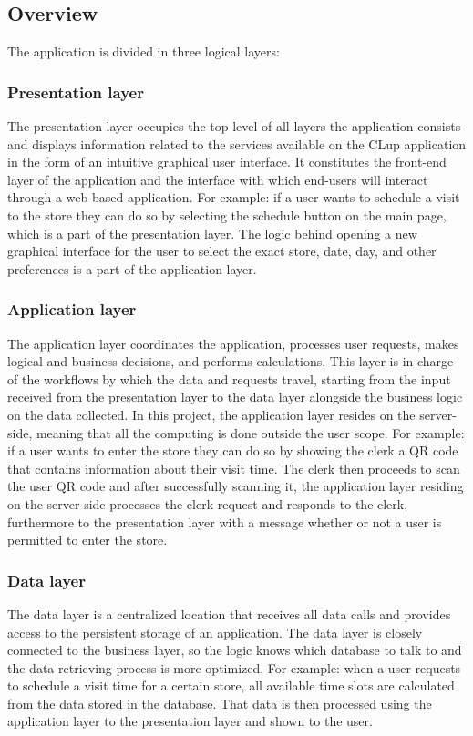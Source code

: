 \subsection{Overview}
The application is divided in three logical layers:
\subsubsection{Presentation layer}
The presentation layer occupies the top level of all layers the application consists and displays information related to the services available on the CLup application in the form of an intuitive graphical user interface.
It constitutes the front-end layer of the application and the interface with which end-users will interact through a web-based application.
For example: if a user wants to schedule a visit to the store they can do so by selecting the schedule button on the main page, which is a part of the presentation layer.
The logic behind opening a new graphical interface for the user to select the exact store, date, day, and other preferences is a part of the application layer.
\subsubsection{Application layer}
The application layer coordinates the application, processes user requests, makes logical and business decisions, and performs calculations.
This layer is in charge of the workflows by which the data and requests travel, starting from the input received from the presentation layer
to the data layer alongside the business logic on the data collected.
In this project, the application layer resides on the server-side, meaning that all the computing is done outside the user scope.
For example: if a user wants to enter the store they can do so by showing the clerk a QR code that contains information about their visit time.
The clerk then proceeds to scan the user QR code and after successfully scanning it, the application layer residing on the server-side processes
the clerk request and responds to the clerk, furthermore to the presentation layer with a message whether or not a user is permitted to enter the store.
\subsubsection{Data layer}
The data layer is a centralized location that receives all data calls and provides access to the persistent storage of an application.
The data layer is closely connected to the business layer, so the logic knows which database to talk to and the data retrieving process is more optimized.
For example: when a user requests to schedule a visit time for a certain store, all available time slots are calculated from the data stored in the database.
That data is then processed using the application layer to the presentation layer and shown to the user.

